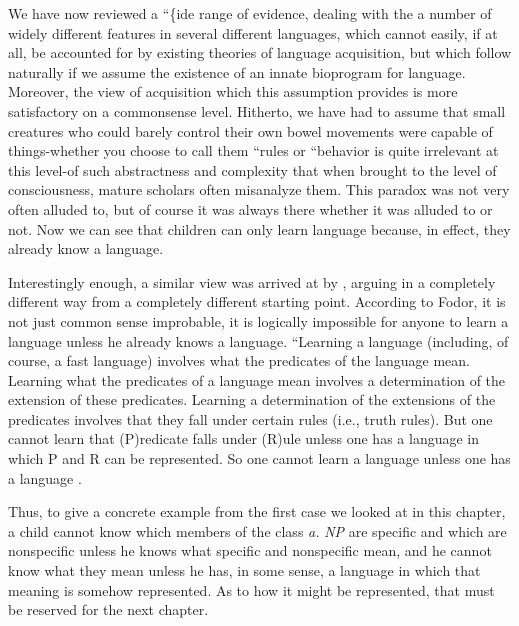 We have now reviewed a ``\{ide range of evidence, dealing with the
 a number of widely different features in several different languages, which cannot easily, if at all, be accounted for by existing theories of language acquisition, but which follow naturally if we assume the existence of an innate bioprogram for language. Moreover, the view of acquisition which this assumption provides is more satisfactory on a commonsense level. Hitherto, we have had to assume that small creatures who could barely control their own bowel movements were capable of  things-whether you choose to call them ``rules or ``behavior is quite irrelevant at this level{}-of such abstractness and complexity that when brought to the level of consciousness, mature scholars often misanalyze them. This paradox was not very often alluded to, but of course it was always there whether it was alluded to or not. Now we can see that children can only learn language because, in effect, they already know a language.

Interestingly enough, a similar view was arrived at by \citet{Fodor1975}, arguing in a completely different way from a completely different starting point. According to Fodor, it is not just common sense improbable, it is logically impossible for anyone to learn a language unless he already knows a language. ``Learning a language (includ\-ing, of course, a fast language) involves  what the predicates of the language mean. Learning what the predicates of a language mean involves  a determination of the extension of these predicates. Learning a determination of the extensions of the predicates involves  that they fall under certain rules (i.e., truth rules). But one cannot learn that (P)redicate falls under (R)ule unless one has a lan\-guage in which P and R can be represented. So one cannot learn a language unless one has a language \citep[63-64]{Fodor1975}.

Thus, to give a concrete example from the first case we looked at in this chapter, a child cannot know which members of the class
\textit{a.} \textit{NP} are specific and which are nonspecific unless he knows what specific and nonspecific mean, and he cannot know what they mean unless he has, in some sense, a language in which that meaning is some\-how represented. As to how it might be represented, that must be
reserved for the next chapter.


